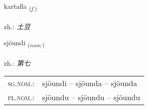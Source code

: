 \documentclass[frontgrid, backgrid]{flacards}\usepackage[]{graphicx}\usepackage[]{xcolor}
\begin{document}
\renewcommand{\flhead}{\vskip5pt \fboxsep=0pt {\small\bfseries\footnotesize Nafnorð | 名词}}
\renewcommand{\fcfoot}{\vskip5pt \fboxsep=0pt \hspace{2pt}{\small\bfseries\footnotesize 3K}}

\renewcommand{\blhead}{\vskip5pt {\small\bfseries\footnotesize Nafnorð | 名词 }}
\renewcommand{\bcfoot}{\vskip5pt \hspace{2pt}{\small\bfseries\footnotesize 3K}}


{kartafla \small{\textsubscript{(\textit{f.})}} \\[1ex] %
 \\
zh.: \emph{土豆} \\  [2ex]
\renewcommand*{\arraystretch}{0.8}
}

\renewcommand{\flhead}{\vskip5pt \fboxsep=0pt {\small\bfseries\footnotesize Töluorð | 数量词}}
\renewcommand{\fcfoot}{\vskip5pt \fboxsep=0pt \hspace{2pt}{\small\bfseries\footnotesize 3K}}

\renewcommand{\blhead}{\vskip5pt {\small\bfseries\footnotesize Töluorð | 数量词 }}
\renewcommand{\bcfoot}{\vskip5pt \hspace{2pt}{\small\bfseries\footnotesize 3K}}


{sjöundi \small{\textsubscript{(\textit{num.})}} \\[1ex] %
\textphonetic{[sjœːʏntɪ]} \\
zh.: \emph{第七} \\  [2ex]
\renewcommand*{\arraystretch}{0.8}
\begin{tabular}{ll}
\textsc{sg.nom.}: & sjöundi  --  sjöunda -- sjöunda \\ 
\textsc{pl.nom.}: & sjöundu -- sjöundu -- sjöundu
\end{tabular}
}
\end{document}

